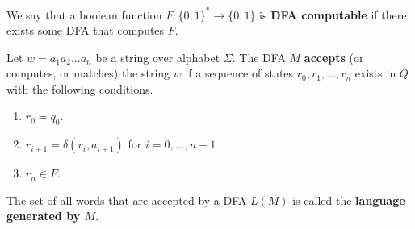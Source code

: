 	\begin{definition}
	  \label{def:dfa-computability}
		We say that a boolean function $F: \{0,1\}^* \to \{0,1\}$ is \textbf{DFA computable} if there exists some DFA that computes $F$. 
  \end{definition}

  \begin{definition}
    \label{def:recognized-language-of-a-dfa}
    Let $w = a_1 a_2 \ldots a_n$ be a string over alphabet $\Sigma$. The DFA $M$ \textbf{accepts} (or computes, or matches) the string $w$ if a sequence of states $r_0, r_1, \ldots, r_n$ exists in $Q$ with the following conditions. 
    \begin{enumerate}
      \item $r_0 = q_0$. 
      \item $r_{i+1} = \delta(r_i, a_{i+1})$ for $i = 0, \ldots, n-1$ 
      \item $r_n \in F$. 
    \end{enumerate}
    The set of all words that are accepted by a DFA $L(M)$ is called the \textbf{language generated by $M$}. 
  \end{definition}

